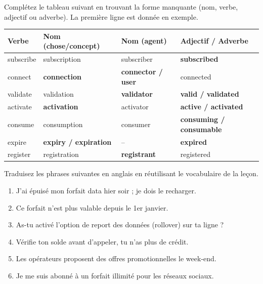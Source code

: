 \documentclass[11pt]{article}
\newcounter{popsec}
\newcounter{popsub}
\newcommand{\courssub}[1]{%
  \stepcounter{popsub}%
  \par\vspace{9pt}\noindent{\popxbold\fontsize{11.5}{13}\selectfont\color{popink}{\color{poporange}\thepopsec.\thepopsub}\hspace{6pt}#1}\par\nopagebreak\vspace{4pt}
}
\begin{document}
\begin{exercice}
Complétez le tableau suivant en trouvant la forme manquante (nom, verbe, adjectif ou adverbe). La première ligne est donnée en exemple.

\begin{center}
\begin{tabularx}{\linewidth}{|X|X|X|X|}
\hline
\rowcolor{popblueL} \textbf{Verbe} & \textbf{Nom (chose/concept)} & \textbf{Nom (agent)} & \textbf{Adjectif / Adverbe} \\
\hline
subscribe & subscription & subscriber & \textbf{subscribed} \\
\hline
connect & \textbf{connection} & \textbf{connector / user} & connected \\
\hline
validate & validation & \textbf{validator} & \textbf{valid / validated} \\
\hline
activate & \textbf{activation} & activator & \textbf{active / activated} \\
\hline
consume & consumption & consumer & \textbf{consuming / consumable} \\
\hline
expire & \textbf{expiry / expiration} & -- & \textbf{expired} \\
\hline
register & registration & \textbf{registrant} & registered \\
\hline
\end{tabularx}
\end{center}
\end{exercice}

\courssub{Je m'entraîne}

\begin{exercice}
Traduisez les phrases suivantes en anglais en réutilisant le vocabulaire de la leçon.
\begin{enumerate}
    \item J'ai épuisé mon forfait data hier soir ; je dois le recharger.
    \item Ce forfait n'est plus valable depuis le 1er janvier.
    \item As-tu activé l'option de report des données (rollover) sur ta ligne ?
    \item Vérifie ton solde avant d'appeler, tu n'as plus de crédit.
    \item Les opérateurs proposent des offres promotionnelles le week-end.
    \item Je me suis abonné à un forfait illimité pour les réseaux sociaux.
\end{enumerate}
\end{exercice}
\end{document}
